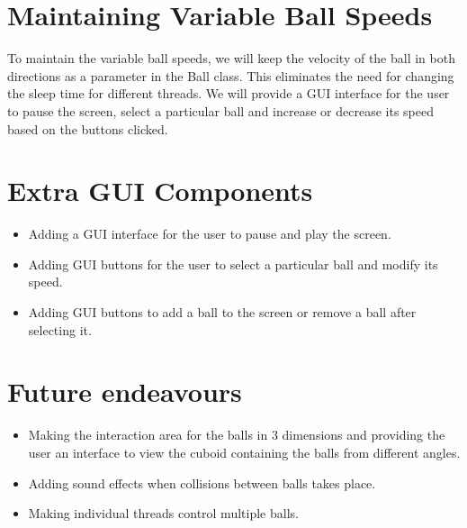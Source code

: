 \documentclass{article}
\begin{document}
\section{Maintaining Variable Ball Speeds}
To maintain the variable ball speeds, we will keep the velocity of the ball in both directions as a parameter in the Ball class. This eliminates the need for changing the sleep time for different threads. We will provide a GUI interface for the user to pause the screen, select a particular ball and increase or decrease its speed based on the buttons clicked.


\section{Extra GUI Components}
\begin{itemize}
\item Adding a GUI interface for the user to pause and play the screen.
\item Adding GUI buttons for the user to select a particular ball and modify its speed.
\item Adding GUI buttons to add a ball to the screen or remove a ball after selecting it.
\end{itemize}

\section{Future endeavours}
\begin{itemize}
\item Making the interaction area for the balls in 3 dimensions and providing the user an interface to view the cuboid containing the balls from different angles. 
\item Adding sound effects when collisions between balls takes place.
\item Making individual threads control multiple balls.
\end{itemize}
\end{document}

